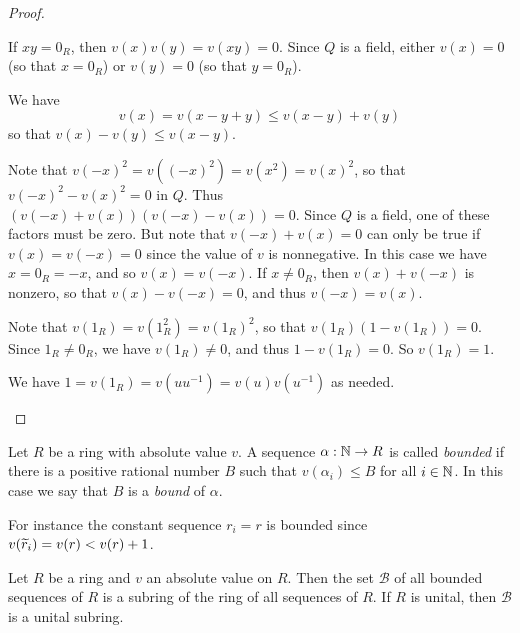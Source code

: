 \begin{proof}
\begin{inlineproplist}
\item If \(xy = 0_R\), then \(v(x)v(y) = v(xy) = 0\).
Since \(Q\) is a field, either \(v(x) = 0\) (so that \(x = 0_R\)) or \(v(y) = 0\) (so that \(y = 0_R\)).
\item We have \[ v(x) = v(x-y+y) \leq v(x-y) + v(y) \] so that \(v(x) - v(y) \leq v(x-y)\).
\item Note that \(v(-x)^2 = v((-x)^2) = v(x^2) = v(x)^2\), so that \(v(-x)^2 - v(x)^2 = 0\) in \(Q\).
Thus \((v(-x) + v(x))(v(-x) - v(x)) = 0\).
Since \(Q\) is a field, one of these factors must be zero.
But note that \(v(-x) + v(x) = 0\) can only be true if \(v(x) = v(-x) = 0\) since the value of \(v\) is nonnegative.
In this case we have \(x = 0_R = -x\), and so \(v(x) = v(-x)\).
If \(x \neq 0_R\), then \(v(x) + v(-x)\) is nonzero, so that \(v(x) - v(-x) = 0\), and thus \(v(-x) = v(x)\).
\item Note that \(v(1_R) = v(1_R^2) = v(1_R)^2\), so that \(v(1_R)(1 - v(1_R)) = 0\).
Since \(1_R \neq 0_R\), we have \(v(1_R) \neq 0\), and thus \(1 - v(1_R) = 0\).
So \(v(1_R) = 1\).
\item We have \(1 = v(1_R) = v(uu^{-1}) = v(u)v(u^{-1})\) as needed.
\end{inlineproplist}
\end{proof}

\begin{dfn}
Let \(R\) be a ring with absolute value \(v\).
A sequence \(\alpha : \mathbb{N} \rightarrow R\) is called \emph{bounded} if there is a positive rational number \(B\) such that \(v(\alpha_i) \leq B\) for all \(i \in \mathbb{N}\).
In this case we say that \(B\) is a \emph{bound} of \(\alpha\).
\end{dfn}

For instance the constant sequence \(r_i = r\) is bounded since \(v(\widetilde{r}_i) = v(r) < v(r) + 1\).

\begin{prop}
Let \(R\) be a ring and \(v\) an absolute value on \(R\).
Then the set \(\mathcal{B}\) of all bounded sequences of \(R\) is a subring of the ring of all sequences of \(R\).
If \(R\) is unital, then \(\mathcal{B}\) is a unital subring.
\end{prop}

